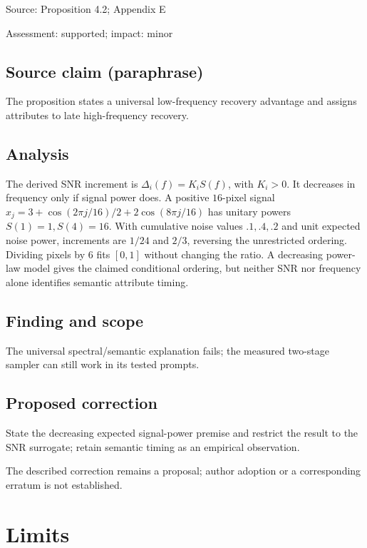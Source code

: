 \documentclass[11pt]{article}
\begin{document}
Source: Proposition 4.2; Appendix E

Assessment: supported; impact: minor

\subsection*{Source claim (paraphrase)}

The proposition states a universal low-frequency recovery advantage and assigns attributes to late high-frequency recovery.

\subsection*{Analysis}

The derived SNR increment is \(\Delta_i(f)=K_iS(f)\), with \(K_i>0\). It decreases in frequency only if signal power does. A positive \(16\)-pixel signal \(x_j=3+\cos(2\pi j/16)/2+2\cos(8\pi j/16)\) has unitary powers \(S(1)=1,S(4)=16\). With cumulative noise values \(.1,.4,.2\) and unit expected noise power, increments are \(1/24\) and \(2/3\), reversing the unrestricted ordering. Dividing pixels by \(6\) fits \([0,1]\) without changing the ratio. A decreasing power-law model gives the claimed conditional ordering, but neither SNR nor frequency alone identifies semantic attribute timing.

\subsection*{Finding and scope}

The universal spectral/semantic explanation fails; the measured two-stage sampler can still work in its tested prompts.

\subsection*{Proposed correction}

State the decreasing expected signal-power premise and restrict the result to the SNR surrogate; retain semantic timing as an empirical observation.

The described correction remains a proposal; author adoption or a corresponding erratum is not established.

\section*{Limits}
\end{document}
